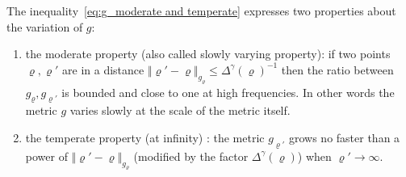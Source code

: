 \documentclass[AHL,Unicode,longabstracts,published]{cedram}
\begin{document}
\begin{rema}
The inequality~\eqref{eq:g_moderate and temperate} expresses two properties about the variation of $g$:
\begin{enumerate}
\item the moderate property (also called slowly varying property): if two points $\varrho,\varrho'$ are in a distance $\Vert \varrho'-\varrho\Vert _{g_{\varrho}}\leq\Delta^{\gamma}(\varrho)^{-1}$ then the ratio between $g_{\varrho},g_{\varrho'}$ is bounded and close to one at high frequencies. In other words the metric $g$ varies slowly at the scale of the metric itself.
\item the temperate property (at infinity) : the metric $g_{\varrho'}$ grows no faster than a power of $\Vert \varrho'-\varrho\Vert _{g_{\varrho}}$ (modified by the factor $\Delta^{\gamma}(\varrho)$) when $\varrho'\to\infty$.
\end{enumerate}
\end{rema}
\end{document}

